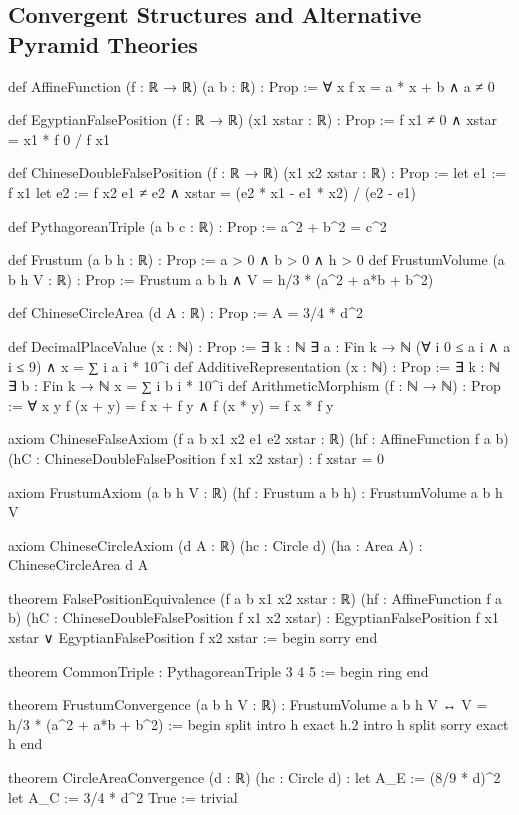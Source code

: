 \documentclass[12pt]{amsart}
\begin{document}
\subsection{Convergent Structures and Alternative Pyramid Theories}
\begin{leanlisting}
	def AffineFunction (f : ℝ → ℝ) (a b : ℝ) : Prop := ∀ x   f x = a * x + b ∧ a ≠ 0
	
	def EgyptianFalsePosition (f : ℝ → ℝ) (x1 xstar : ℝ) : Prop :=
	f x1 ≠ 0 ∧ xstar = x1 * f 0 / f x1
	
	def ChineseDoubleFalsePosition (f : ℝ → ℝ) (x1 x2 xstar : ℝ) : Prop :=
	let e1 := f x1
	let e2 := f x2
	e1 ≠ e2 ∧ xstar = (e2 * x1 - e1 * x2) / (e2 - e1)
	
	def PythagoreanTriple (a b c : ℝ) : Prop := a^2 + b^2 = c^2
	
	def Frustum (a b h : ℝ) : Prop := a > 0 ∧ b > 0 ∧ h > 0
	def FrustumVolume (a b h V : ℝ) : Prop := Frustum a b h ∧ V = h/3 * (a^2 + a*b + b^2)
	
	def ChineseCircleArea (d A : ℝ) : Prop := A = 3/4 * d^2
	
	def DecimalPlaceValue (x : ℕ) : Prop := ∃ k : ℕ   ∃ a : Fin k → ℕ   (∀ i   0 ≤ a i ∧ a i ≤ 9) ∧ x = ∑ i   a i * 10^i
	def AdditiveRepresentation (x : ℕ) : Prop := ∃ k : ℕ   ∃ b : Fin k → ℕ   x = ∑ i   b i * 10^i
	def ArithmeticMorphism (f : ℕ → ℕ) : Prop := ∀ x y   f (x + y) = f x + f y ∧ f (x * y) = f x * f y
	
	axiom ChineseFalseAxiom (f a b x1 x2 e1 e2 xstar : ℝ)
	(hf : AffineFunction f a b)
	(hC : ChineseDoubleFalsePosition f x1 x2 xstar) :
	f xstar = 0
	
	axiom FrustumAxiom (a b h V : ℝ) (hf : Frustum a b h) :
	FrustumVolume a b h V
	
	axiom ChineseCircleAxiom (d A : ℝ) (hc : Circle d) (ha : Area A) :
	ChineseCircleArea d A
	
	theorem FalsePositionEquivalence (f a b x1 x2 xstar : ℝ)
	(hf : AffineFunction f a b)
	(hC : ChineseDoubleFalsePosition f x1 x2 xstar) :
	EgyptianFalsePosition f x1 xstar ∨ EgyptianFalsePosition f x2 xstar :=
	begin
	sorry
	end
	
	theorem CommonTriple : PythagoreanTriple 3 4 5 :=
	begin
	ring  
	end
	
	theorem FrustumConvergence (a b h V : ℝ) :
	FrustumVolume a b h V ↔ V = h/3 * (a^2 + a*b + b^2) :=
	begin
	split  
	{ intro h   exact h.2 }  
	{ intro h   split   sorry   exact h }  
	end
	
	theorem CircleAreaConvergence (d : ℝ) (hc : Circle d) :
	let A_E := (8/9 * d)^2
	let A_C := 3/4 * d^2
	True := trivial
	

\end{leanlisting}
\end{document}
